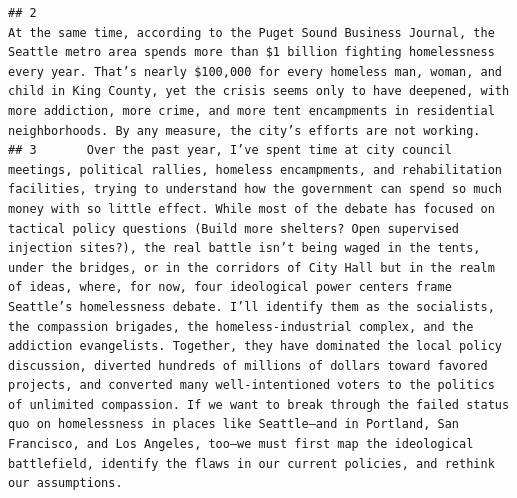 \documentclass[
]{article}
\begin{document}
\begin{verbatim}
## 2                                                                                                                                                                                                                                                                                                                                                                                                                                                                                                                                                                                                                                                                                                                                                                         At the same time, according to the Puget Sound Business Journal, the Seattle metro area spends more than $1 billion fighting homelessness every year. That’s nearly $100,000 for every homeless man, woman, and child in King County, yet the crisis seems only to have deepened, with more addiction, more crime, and more tent encampments in residential neighborhoods. By any measure, the city’s efforts are not working.
## 3       Over the past year, I’ve spent time at city council meetings, political rallies, homeless encampments, and rehabilitation facilities, trying to understand how the government can spend so much money with so little effect. While most of the debate has focused on tactical policy questions (Build more shelters? Open supervised injection sites?), the real battle isn’t being waged in the tents, under the bridges, or in the corridors of City Hall but in the realm of ideas, where, for now, four ideological power centers frame Seattle’s homelessness debate. I’ll identify them as the socialists, the compassion brigades, the homeless-industrial complex, and the addiction evangelists. Together, they have dominated the local policy discussion, diverted hundreds of millions of dollars toward favored projects, and converted many well-intentioned voters to the politics of unlimited compassion. If we want to break through the failed status quo on homelessness in places like Seattle—and in Portland, San Francisco, and Los Angeles, too—we must first map the ideological battlefield, identify the flaws in our current policies, and rethink our assumptions.

\end{verbatim}
\end{document}
